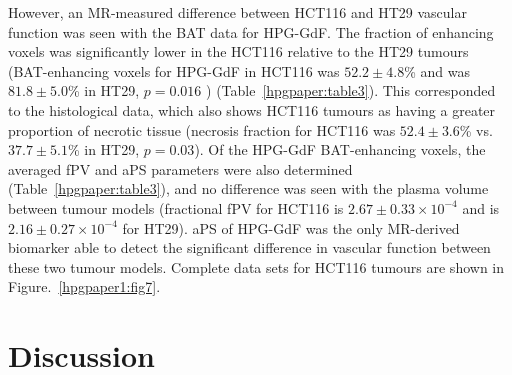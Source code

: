 However, an MR-measured difference between HCT116 and HT29 vascular function was seen with the \acs{BAT} data for \acs{HPG-GdF}.
The fraction of enhancing voxels was significantly lower in the HCT116 relative to the HT29 tumours (BAT-enhancing voxels for \acs{HPG-GdF} in HCT116 was $52.2\pm 4.8$\% and was $81.8\pm 5.0$\% in HT29, $p=0.016$ ) (Table~\ref{hpgpaper:table3}).
This corresponded to the histological data, which also shows HCT116 tumours as having a greater proportion of necrotic tissue (necrosis fraction for HCT116 was $52.4\pm 3.6$\% vs. $37.7\pm 5.1$\% in HT29, $p=0.03$).
Of the \acs{HPG-GdF} \acs{BAT}-enhancing voxels, the averaged \acs{fPV} and \acs{aPS} parameters were also determined (Table~\ref{hpgpaper:table3}), and no difference was seen with the plasma volume between tumour models (fractional \acs{fPV} for HCT116 is $2.67\pm 0.33\times10^{-4}$ and is $2.16\pm 0.27 \times10^{-4}$ for HT29).
\acs{aPS} of \acs{HPG-GdF} was the only MR-derived biomarker able to detect the significant difference in vascular function between these two tumour models.
Complete data sets for HCT116 tumours are shown in Figure.~\ref{hpgpaper1:fig7}.

\section{Discussion}

